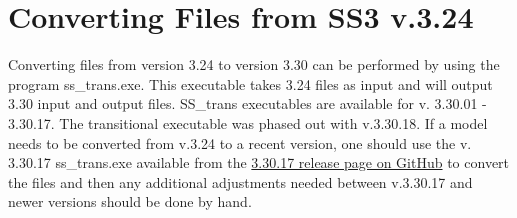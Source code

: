 \hypertarget{ConvIssues}{}
\section{Converting Files from SS3 v.3.24}
Converting files from version 3.24 to version 3.30 can be performed by using the program ss\_trans.exe. This executable takes 3.24 files as input and will output 3.30 input and output files. SS\_trans executables are available for v. 3.30.01 - 3.30.17. The transitional executable was phased out with v.3.30.18. If a model needs to be converted from v.3.24 to a recent version, one should use the v. 3.30.17 ss\_trans.exe available from the \href{https://github.com/nmfs-stock-synthesis/stock-synthesis/releases/tag/v3.30.17}{3.30.17 release page on GitHub} to convert the files and then any additional adjustments needed between v.3.30.17 and newer versions should be done by hand.

